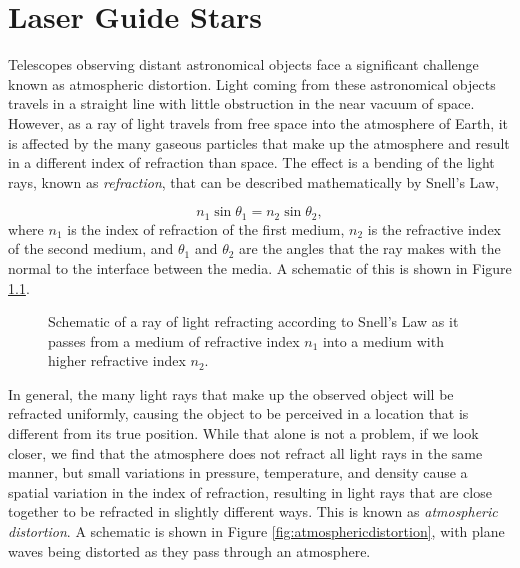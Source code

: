 
\appendix

\chapter{Laser Guide Stars}

Telescopes observing distant astronomical objects face a significant challenge known as atmospheric distortion. Light coming from these astronomical objects travels in a straight line with little obstruction in the near vacuum of space. However, as a ray of light travels from free space into the atmosphere of Earth, it is affected by the many gaseous particles that make up the atmosphere and result in a different index of refraction than space. The effect is a bending of the light rays, known as \textit{refraction}, that can be described mathematically by Snell's Law, 

\begin{equation}
  n_1 \sin \theta_1 = n_2 \sin \theta_2,
  \label{snellslaw}
\end{equation}
%
where $n_1$ is the index of refraction of the first medium, $n_2$ is the refractive index of the second medium, and $\theta_1$ and $\theta_2$ are the angles that the ray makes with the normal to the interface between the media. A schematic of this is shown in Figure \ref{snellsfigure}.

\begin{figure}[ht!]
  \center
  
\caption{Schematic of a ray of light refracting according to Snell's Law as it passes from a medium of refractive index $n_1$ into a medium with higher refractive index $n_2$.}
\label{snellsfigure}
\end{figure}

In general, the many light rays that make up the observed object will be refracted uniformly, causing the object to be perceived in a location that is different from its true position. While that alone is not a problem, if we look closer, we find that the atmosphere does not refract all light rays in the same manner, but small variations in pressure, temperature, and density cause a spatial variation in the index of refraction, resulting in light rays that are close together to be refracted in slightly different ways. This is known as \textit{atmospheric distortion}. A schematic is shown in Figure \ref{fig:atmosphericdistortion}, with plane waves being distorted as they pass through an atmosphere.


